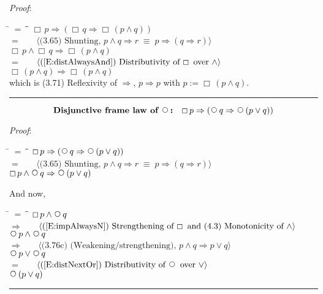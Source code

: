 \documentclass[12pt, fleqn, leqno]{article}
\newcommand{\lgap}{2pt}                             %
\newcommand{\mymathindent}{24pt}                    %
\newcommand{\equivs}{\ensuremath{\;\equiv\;}}       %
\newcommand{\impl}{\ensuremath{\Rightarrow}}        %
\newcommand{\Next}{\;\,\text{\raisebox{3.5pt}{\circle{6}}}}
\newcommand{\Always}{\Box\,}
\newcommand{\myqed}{\rule[-.23ex]{1.2ex}{2.0ex}}
\newcommand{\myqedtab}{\hspace{384pt}}              %
\newcommand{\Gll} {\langle}                         %
\newcommand{\Ggg} {\rangle}                         %
\newcommand{\Hint}[1]     {\ \ \ $\Gll              \mbox{#1} \Ggg$ }   %
\begin{document}
\emph{Proof}: 
\begin{tabbing}
\hspace{\mymathindent} \= $= \;$ \= \myqedtab \= \kill
  \> \>   $\Always p \impl (\Always q \impl \Always (p \land q))$\\[\lgap]
  \> $=$  \>  \Hint{(3.65) Shunting, $p\land q\impl r\equivs p\impl (q\impl r)$}\\[\lgap]
  \> \>   $\Always p \land \Always q \impl \Always (p \land q)$\\[\lgap]
  \> $=$  \>  \Hint{(\ref{E:distAlwaysAnd}) Distributivity of $\Always$ over $\land$}\\[\lgap]
  \> \>   $\Always (p \land q) \impl \Always (p \land q)$\\[\lgap]
   \> which is (3.71) Reflexivity of $\impl$, $p\impl p$ with $p:=\Always (p \land q)$. \quad \myqed
\end{tabbing}

\begin{equation}\label{E:disjframelawnext}
\textbf{Disjunctive frame law of $\Next$:}\quad \Always p \impl (\Next q \impl \Next (p \lor q))
\end{equation}

\emph{Proof}:
\begin{tabbing}
\hspace{\mymathindent} \= $= \;$ \= \myqedtab \= \kill
  \> \>   $\Always p \impl (\Next q \impl \Next (p \lor q))$\\[\lgap]
  \> $=$  \>  \Hint{(3.65) Shunting, $p\land q\impl r\equivs p\impl (q\impl r)$}\\[\lgap]
  \> \>   $\Always p \land \Next q \impl \Next (p \lor q)$
\end{tabbing}
And now,
\begin{tabbing}
\hspace{\mymathindent} \= $= \;$ \= \myqedtab \= \kill
  \> \>   $\Always p \land \Next q $\\[\lgap]
  \> $\impl$  \>  \Hint{(\ref{E:impAlwaysN}) Strengthening of $\Always$ and (4.3) Monotonicity of $\land$}\\[\lgap]
  \> \>   $\Next p \land \Next q $\\[\lgap]
   \> $\impl$ \> \Hint{(3.76c) (Weakening/strengthening), $p\land q \impl p \lor q$} \\[\lgap]
   \> \>   $\Next p \lor \Next q $\\[\lgap]
  \> $=$  \>  \Hint{(\ref{E:distNextOr}) Distributivity of $\Next$ over $\lor$}\\[\lgap]
  \> \>   $\Next (p \lor q)$\quad \myqed
\end{tabbing}
\end{document}
